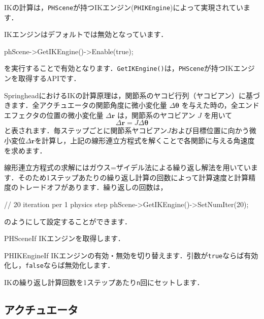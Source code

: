 IKの計算は，\texttt{PHScene}が持つIKエンジン(\texttt{PHIKEngine})によって実現されています．

IKエンジンはデフォルトでは無効となっています．
\begin{sourcecode}
phScene->GetIKEngine()->Enable(true);
\end{sourcecode}
\KLUDGE を実行することで有効となります．\texttt{GetIKEngine()}は，\texttt{PHScene}が持つIKエンジンを取得するAPIです．

SpringheadにおけるIKの計算原理は，関節系のヤコビ行列（ヤコビアン）に基づきます．全アクチュエータの関節角度に微小変化量 $\varDelta\bm{\theta}$ を与えた時の，全エンドエフェクタの位置の微小変化量 $\varDelta\bm{r}$ は，関節系のヤコビアン $J$ を用いて
\[
\varDelta\bm{r} = J \varDelta\bm{\theta}
\]
\KLUDGE と表されます．毎ステップごとに関節系ヤコビアン$J$および目標位置に向かう微小変位$\varDelta\bm{r}$を計算し，上記の線形連立方程式を解くことで各関節に与える角速度を求めます．

\KLUDGE 線形連立方程式の求解にはガウス=ザイデル法による繰り返し解法を用いています．そのため1ステップあたりの繰り返し計算の回数によって計算速度と計算精度のトレードオフがあります．繰り返しの回数は，
\begin{sourcecode}
// 20 iteration per 1 physics step
phScene->GetIKEngine()->SetNumIter(20);
\end{sourcecode}
\KLUDGE のようにして設定することができます．

\KLUDGE %
\KLUDGE %

\begin{reference}{PHSceneIf}
IKエンジンを取得します．
\end{reference}

\begin{reference}{PHIKEngineIf}
IKエンジンの有効・無効を切り替えます．引数が\texttt{true}ならば有効化し，\texttt{false}ならば無効化します．

IKの繰り返し計算回数を1ステップあたり\texttt{n}回にセットします．
\end{reference}



\KLUDGE %
\subsection*{アクチュエータ}
\KLUDGE %

